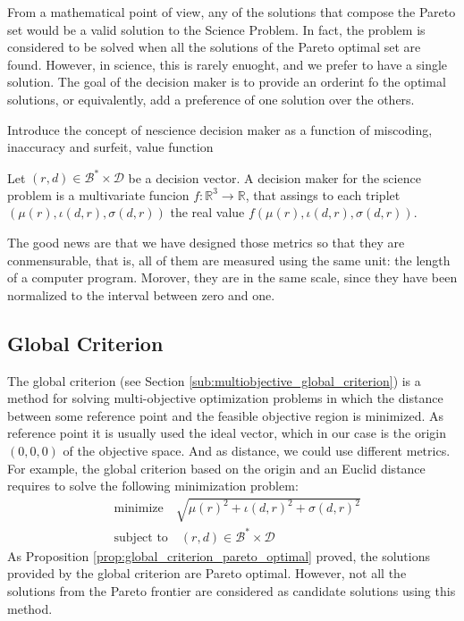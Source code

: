 From a mathematical point of view, any of the solutions that compose the Pareto set would be a valid solution to the Science Problem. In fact, the problem is considered to be solved when all the solutions of the Pareto optimal set are found. However, in science, this is rarely enuoght, and we prefer to have a single solution. The goal of the decision maker is to provide an orderint fo the optimal solutions, or equivalently, add a preference of one solution over the others.

{\color{red} Introduce the concept of nescience decision maker as a function of miscoding, inaccuracy and surfeit, value function}

\begin{definition}
Let $(r, d) \in \mathcal{B}^\ast \times \mathcal{D}$ be a decision vector. A decision maker for the science problem is a multivariate funcion $f : \mathbb{R}^3 \rightarrow \mathbb{R}$, that assings to each triplet $\left( \mu(r), \iota(d, r), \sigma(d, r) \right)$ the real value $f\left( \mu(r), \iota(d, r), \sigma(d, r) \right)$. 
\end{definition}

{\color{red} The good news are that we have designed those metrics so that they are conmensurable, that is, all of them are measured using the same unit: the length of a computer program. Morover, they are in the same scale, since they have been normalized to the interval between zero and one.}


\subsection{Global Criterion}

The global criterion (see Section \ref{sub:multiobjective_global_criterion}) is a method for solving multi-objective optimization problems in which the distance between some reference point and the feasible objective region is minimized. As reference point it is usually used the ideal vector, which in our case is the origin $(0, 0, 0)$ of the objective space. And as distance, we could use different metrics. For example, the global criterion based on the origin and an Euclid distance requires to solve the following minimization problem:
\begin{align*}
    & \text{minimize} \quad \sqrt{ \mu(r)^2 + \iota(d, r)^2 + \sigma(d, r)^2 } \\
    & \text{subject to} \quad (r, d) \in \mathcal{B}^\ast \times \mathcal{D}
\end{align*}
As Proposition \ref{prop:global_criterion_pareto_optimal} proved, the solutions provided by the global criterion are Pareto optimal. However, not all the solutions from the Pareto frontier are considered as candidate solutions using this method.

